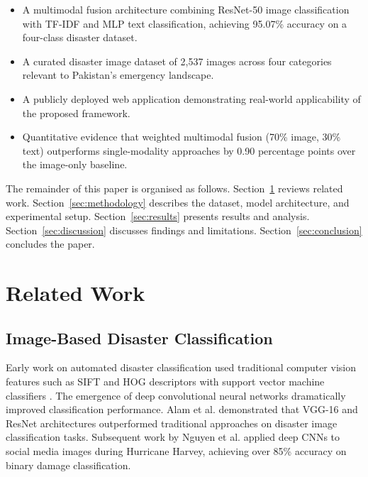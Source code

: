\documentclass[conference]{IEEEtran}
\begin{document}
\begin{itemize}
    \item A multimodal fusion architecture combining ResNet-50 image classification with TF-IDF and MLP text classification, achieving 95.07\% accuracy on a four-class disaster dataset.
    \item A curated disaster image dataset of 2,537 images across four categories relevant to Pakistan's emergency landscape.
    \item A publicly deployed web application demonstrating real-world applicability of the proposed framework.
    \item Quantitative evidence that weighted multimodal fusion (70\% image, 30\% text) outperforms single-modality approaches by 0.90 percentage points over the image-only baseline.
\end{itemize}

The remainder of this paper is organised as follows. Section~\ref{sec:related} reviews related work. Section~\ref{sec:methodology} describes the dataset, model architecture, and experimental setup. Section~\ref{sec:results} presents results and analysis. Section~\ref{sec:discussion} discusses findings and limitations. Section~\ref{sec:conclusion} concludes the paper.

\section{Related Work}
\label{sec:related}

\subsection{Image-Based Disaster Classification}

Early work on automated disaster classification used traditional computer vision features such as SIFT and HOG descriptors with support vector machine classifiers \cite{li2015tweet}. The emergence of deep convolutional neural networks dramatically improved classification performance. Alam et al. \cite{alam2018processing} demonstrated that VGG-16 and ResNet architectures outperformed traditional approaches on disaster image classification tasks. Subsequent work by Nguyen et al. \cite{nguyen2017damage} applied deep CNNs to social media images during Hurricane Harvey, achieving over 85\% accuracy on binary damage classification.
\end{document}

